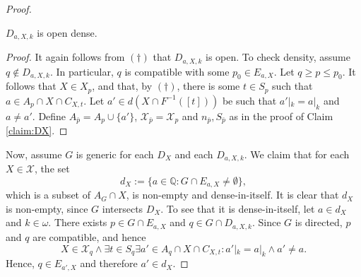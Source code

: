 \documentclass[10pt,a4paper]{amsart}
\begin{document}
\begin{proof}
\begin{claim}
$D_{a,X,k}$ is open dense.
\end{claim}

\begin{proof}
It again follows from $(\dagger)$ that $D_{a,X,k}$ is open. To check density, assume $q \notin D_{a,X,k}$. In particular, $q$ is compatible with some $p_0 \in E_{a,X}$. Let $q \geq p \leq p_0$. It follows that $X \in X_p$, and that, by $(\dagger)$, there is some $t \in S_{p}$ such that $a \in A_{p}\cap X \cap C_{X,t}$. Let $a' \in d(X \cap F^{-1}([t]))$ be such that $a'|_k=a|_k$ and $a \neq a'$. Define $A_{\bar p}=A_p \cup \{a'\}$, $\mathcal{X}_{\bar p}=\mathcal{X}_p$ and $n_{\bar p}, S_{\bar p}$ as in the proof of Claim \ref{claim:DX}.
\end{proof}

Now, assume $G$ is generic for each $D_X$ and each $D_{a,X,k}$. We claim that for each $X \in \mathcal{X}$, the set 
\[d_X:=\{a \in \mathbb{Q}: G \cap E_{a,X} \neq \emptyset\},\] which is a subset of $A_G \cap X$, is non-empty and dense-in-itself. It is clear that $d_X$ is non-empty, since $G$ intersects $D_X$. To see that it is dense-in-itself, let $a \in d_X$ and $k \in \omega$. There exists $p \in G \cap E_{a,X}$ and $q \in G \cap D_{a,X,k}$. Since $G$ is directed, $p$ and $q$ are compatible, and hence 
\[X \in \mathcal{X}_q \land \exists t \in S_q \exists a' \in A_q \cap X \cap C_{X,t}: a'|_k = a|_k \land a' \neq a.\]
Hence, $q \in E_{a', X}$ and therefore $a' \in d_X$.
\end{proof}
\end{document}
